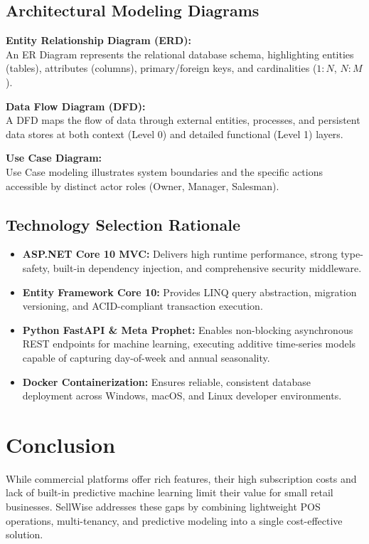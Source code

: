 \documentclass[12pt,a4paper]{report}
\begin{document}
\subsection{Architectural Modeling Diagrams}

\textbf{Entity Relationship Diagram (ERD):}\\
An ER Diagram represents the relational database schema, highlighting entities (tables), attributes (columns), primary/foreign keys, and cardinalities ($1:N$, $N:M$).

\textbf{Data Flow Diagram (DFD):}\\
A DFD maps the flow of data through external entities, processes, and persistent data stores at both context (Level 0) and detailed functional (Level 1) layers.

\textbf{Use Case Diagram:}\\
Use Case modeling illustrates system boundaries and the specific actions accessible by distinct actor roles (Owner, Manager, Salesman).

\subsection{Technology Selection Rationale}
\begin{itemize}
    \item \textbf{ASP.NET Core 10 MVC:} Delivers high runtime performance, strong type-safety, built-in dependency injection, and comprehensive security middleware.
    \item \textbf{Entity Framework Core 10:} Provides LINQ query abstraction, migration versioning, and ACID-compliant transaction execution.
    \item \textbf{Python FastAPI \& Meta Prophet:} Enables non-blocking asynchronous REST endpoints for machine learning, executing additive time-series models capable of capturing day-of-week and annual seasonality.
    \item \textbf{Docker Containerization:} Ensures reliable, consistent database deployment across Windows, macOS, and Linux developer environments.
\end{itemize}

\section{Conclusion}
While commercial platforms offer rich features, their high subscription costs and lack of built-in predictive machine learning limit their value for small retail businesses. SellWise addresses these gaps by combining lightweight POS operations, multi-tenancy, and predictive modeling into a single cost-effective solution.
\end{document}
